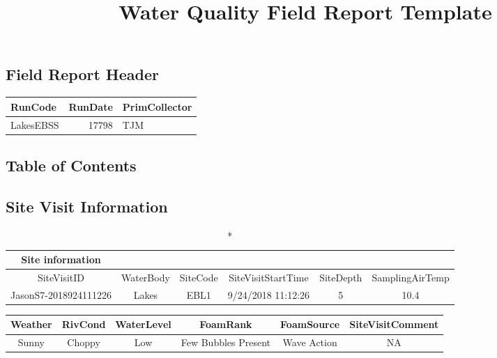 \documentclass[
  letterpaper,
  DIV=11,
  numbers=noendperiod]{scrartcl}
\title{Water Quality Field Report Template}
\author{}
\date{}
\begin{document}
\maketitle
\ifdefined\Shaded\renewenvironment{Shaded}{\begin{tcolorbox}[interior hidden, boxrule=0pt, breakable, enhanced, sharp corners, frame hidden, borderline west={3pt}{0pt}{shadecolor}]}{\end{tcolorbox}}\fi

\hypertarget{field-report-header}{%
\subsection{Field Report Header}\label{field-report-header}}

\begin{longtable*}{lrl}
\toprule
RunCode & RunDate & PrimCollector \\ 
\midrule\addlinespace[2.5pt]
LakesEBSS & 17798 & TJM \\ 
\bottomrule
\end{longtable*}

\hypertarget{table-of-contents}{%
\subsection{Table of Contents}\label{table-of-contents}}

\hypertarget{site-visit-information}{%
\subsection{Site Visit Information}\label{site-visit-information}}

\begin{longtable*}{cccccc}
\caption*{
{\large Site information}
} \\ 
\toprule
SiteVisitID & WaterBody & SiteCode & SiteVisitStartTime & SiteDepth & SamplingAirTemp \\ 
\midrule\addlinespace[2.5pt]
JasonS7-2018924111226 & Lakes & EBL1 & 9/24/2018 11:12:26 & 5 & 10.4 \\ 
\bottomrule
\end{longtable*}

\begin{longtable*}{cccccc}
\toprule
Weather & RivCond & WaterLevel & FoamRank & FoamSource & SiteVisitComment \\ 
\midrule\addlinespace[2.5pt]
Sunny & Choppy & Low & Few Bubbles Present & Wave Action & NA \\ 
\bottomrule
\end{longtable*}
\end{document}
